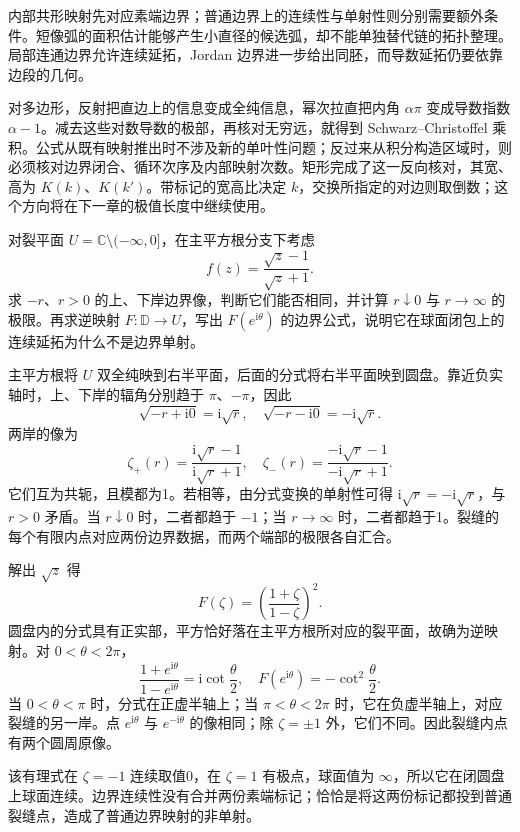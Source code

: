 




\begin{chaptersummary}
内部共形映射先对应素端边界；普通边界上的连续性与单射性则分别需要额外条件。短像弧的面积估计能够产生小直径的候选弧，却不能单独替代链的拓扑整理。局部连通边界允许连续延拓，Jordan 边界进一步给出同胚，而导数延拓仍要依靠边段的几何。

\ProseParagraphBreak

对多边形，反射把直边上的信息变成全纯信息，幂次拉直把内角 \(\alpha\pi\) 变成导数指数 \(\alpha-1\)。减去这些对数导数的极部，再核对无穷远，就得到 Schwarz--Christoffel 乘积。公式从既有映射推出时不涉及新的单叶性问题；反过来从积分构造区域时，则必须核对边界闭合、循环次序及内部映射次数。矩形完成了这一反向核对，其宽、高为 \(K(k)\)、\(K(k')\)。带标记的宽高比决定 \(k\)，交换所指定的对边则取倒数；这个方向将在下一章的极值长度中继续使用。
\end{chaptersummary}

\BookExercises

\begin{exercise}\label{b3:ex:07-1}
对裂平面 \(U=\mathbb C\setminus(-\infty,0]\)，在主平方根分支下考虑
\[
 f(z)=\frac{\sqrt z-1}{\sqrt z+1}.
\]
求 \(-r\)、\(r>0\) 的上、下岸边界像，判断它们能否相同，并计算 \(r\downarrow0\) 与 \(r\to\infty\) 的极限。再求逆映射 \(F:\mathbb D\to U\)，写出 \(F(e^{\mathrm i\theta})\) 的边界公式，说明它在球面闭包上的连续延拓为什么不是边界单射。
\end{exercise}
\begin{solution}
主平方根将 \(U\) 双全纯映到右半平面，后面的分式将右半平面映到圆盘。靠近负实轴时，上、下岸的辐角分别趋于 \(\pi\)、\(-\pi\)，因此
\[
 \sqrt{-r+\mathrm i0}=\mathrm i\sqrt r,\quad
 \sqrt{-r-\mathrm i0}=-\mathrm i\sqrt r.
\]
两岸的像为
\[
 \zeta_+(r)=\frac{\mathrm i\sqrt r-1}{\mathrm i\sqrt r+1},
 \quad
 \zeta_-(r)=\frac{-\mathrm i\sqrt r-1}{-\mathrm i\sqrt r+1}.
\]
它们互为共轭，且模都为1。若相等，由分式变换的单射性可得
\(\mathrm i\sqrt r=-\mathrm i\sqrt r\)，与 \(r>0\) 矛盾。当 \(r\downarrow0\) 时，二者都趋于 \(-1\)；当 \(r\to\infty\) 时，二者都趋于1。裂缝的每个有限内点对应两份边界数据，而两个端部的极限各自汇合。

解出 \(\sqrt z\) 得
\[
 F(\zeta)=\left(\frac{1+\zeta}{1-\zeta}\right)^2.
\]
圆盘内的分式具有正实部，平方恰好落在主平方根所对应的裂平面，故确为逆映射。对 \(0<\theta<2\pi\)，
\[
 \frac{1+e^{\mathrm i\theta}}{1-e^{\mathrm i\theta}}
 =\mathrm i\cot\frac\theta2,
 \quad
 F(e^{\mathrm i\theta})=-\cot^2\frac\theta2.
\]
当 \(0<\theta<\pi\) 时，分式在正虚半轴上；当 \(\pi<\theta<2\pi\) 时，它在负虚半轴上，对应裂缝的另一岸。点 \(e^{\mathrm i\theta}\) 与 \(e^{-\mathrm i\theta}\) 的像相同；除 \(\zeta=\pm1\) 外，它们不同。因此裂缝内点有两个圆周原像。

该有理式在 \(\zeta=-1\) 连续取值0，在 \(\zeta=1\) 有极点，球面值为 \(\infty\)，所以它在闭圆盘上球面连续。边界连续性没有合并两份素端标记；恰恰是将这两份标记都投到普通裂缝点，造成了普通边界映射的非单射。
\end{solution}

